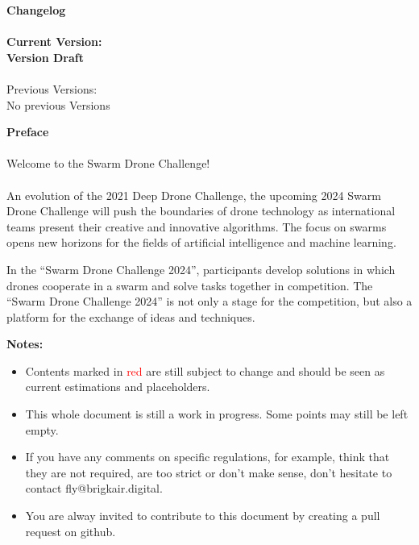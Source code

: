 
\newpage
{\bf Changelog}
\\ \\{\bf Current Version: \\Version Draft \getVersion{}}
\\ \\Previous Versions: \\ No previous Versions

\newpage
{\bf Preface}
\\ \\ Welcome to the Swarm Drone Challenge! \\ \\
An evolution of the 2021 Deep Drone Challenge, the upcoming 2024 Swarm Drone Challenge will push the boundaries of drone technology as international teams present their creative and innovative algorithms. The focus on swarms opens new horizons for the fields of artificial intelligence and machine learning.

In the “Swarm Drone Challenge 2024”, participants develop solutions in which drones cooperate in a swarm and solve tasks together in competition. The “Swarm Drone Challenge 2024” is not only a stage for the competition, but also a platform for the exchange of ideas and techniques.
\newpage


{\bf Notes:
	\begin{itemize}
		\item{Contents marked in \textcolor{red}{red} are still subject to change and should be seen as current estimations and placeholders.}
		\item{This whole document is still a work in progress. Some points may still be left empty.}
		\item{If you have any comments on specific regulations, for example, think that they are not required, are too strict or don't make sense, don't hesitate to contact fly@brigkair.digital.}
		\item{You are alway invited to contribute to this document by creating a pull request on github.}
	\end{itemize}
}
\hspace{10mm}

\newpage
\newpage



